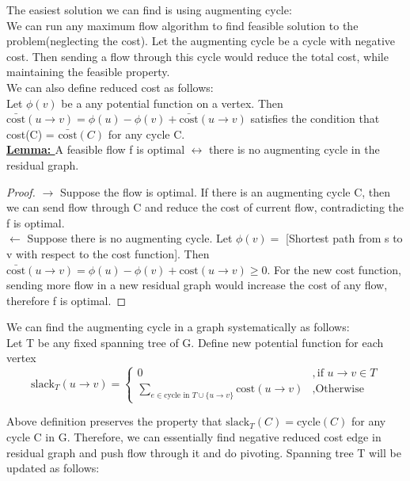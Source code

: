 \documentclass{article}
\begin{document}
The easiest solution we can find is using augmenting cycle: \\
We can run any maximum flow algorithm to find feasible solution to the 
problem(neglecting the cost). Let the augmenting cycle be a cycle with negative cost. 
Then sending a flow through this cycle would reduce the total cost, while 
maintaining the feasible property.  \\
We can also define reduced cost as follows: \\
Let $\phi(v)$ be a any potential function on a vertex. Then 
$\bar{\text{cost}}(u \rightarrow v) = \phi(u) - \phi(v) + \bar{\text{cost}} (u \rightarrow v)$ 
satisfies the condition that cost(C) =  $\bar{\text{cost}}(C)$ for any cycle C.\\

\textbf{\underline{Lemma: }} A feasible flow f is optimal $\leftrightarrow$ there 
is no augmenting cycle in the residual graph. \\

\begin{proof}
$\rightarrow$ Suppose the flow is optimal. If there is an augmenting cycle C, 
then we can send flow through C and reduce the cost of current flow, contradicting the f is optimal. \\
$\leftarrow$ Suppose there is no augmenting cycle. Let $\phi(v) = $ 
[Shortest path from s to v with respect to the cost function]. Then 
$\bar{\text{cost}}(u \rightarrow v) = \phi(u) - \phi(v) + \text{cost}(u \rightarrow v) \geq 0$. 
For the new cost function, sending more flow in a new residual graph would 
increase the cost of any flow, therefore f is optimal.
\end{proof}

We can find the augmenting cycle in a graph systematically as follows: \\
Let T be any fixed spanning tree of G. Define new potential function for each vertex
\[ \text{slack}_{T}(u \rightarrow v) = \begin{cases} 0 & ,\mbox{if } u \rightarrow v \in T \\
  \sum \limits_{e \in \text{cycle in } T \cup \{u \rightarrow v\} } 
    \text{cost}(u \rightarrow v) & ,\mbox{Otherwise } \end{cases}\]

Above definition preserves the property that $\text{slack}_T(C) = \text{cycle}(C)$ 
for any cycle C in G. Therefore, we can essentially find negative reduced cost 
edge in residual graph and push flow through it and do pivoting. 
Spanning tree T will be updated as follows: \\
\end{document}

